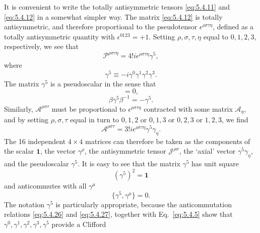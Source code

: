 It is convenient to write the totally antisymmetric tensors \eqref{eq:5.4.11} and
\eqref{eq:5.4.12} in a somewhat simpler way. The matrix \eqref{eq:5.4.12} is totally
antisymmetric, and therefore proportional to the pseudotensor
$\epsilon^{\rho\sigma\tau\eta}$, defined as a totally antisymmetric quantity
with $\epsilon^{0123}=+1$. Setting $\rho,\sigma,\tau,\eta$ equal to $0,1,2,3$,
respectively, we see that
\begin{equation}
\mathcal{P}^{\rho\sigma\tau\eta}=4!i\epsilon^{\rho\sigma\tau\eta}\gamma^5,
\tag{5.4.21}\label{eq:5.4.21}
\end{equation}
where
\begin{equation}
\gamma^5\equiv-i\gamma^0\gamma^1\gamma^2\gamma^3.
\tag{5.4.22}\label{eq:5.4.22}
\end{equation}
The matrix $\gamma^5$ is a pseudoscalar in the sense that
\begin{equation}
[\mathcal{J}^{\rho\sigma},\gamma^5]=0,
\tag{5.4.23}\label{eq:5.4.23}
\end{equation}
\begin{equation}
\beta\gamma^5\beta^{-1}=-\gamma^5.
\tag{5.4.24}\label{eq:5.4.24}
\end{equation}
Similarly, $\mathcal{A}^{\rho\sigma\tau}$ must be proportional to
$\epsilon^{\rho\sigma\tau\eta}$ contracted with some matrix $\mathcal{A}_\eta$,
and by setting $\rho,\sigma,\tau$ equal in turn to $0,1,2$ or $0,1,3$ or
$0,2,3$ or $1,2,3$, we find
\begin{equation}
\mathcal{A}^{\rho\sigma\tau}=3!i\epsilon^{\rho\sigma\tau\eta}\gamma^5\gamma_\eta.
\tag{5.4.25}\label{eq:5.4.25}
\end{equation}
The 16 independent $4\times4$ matrices can therefore be taken as the
components of the scalar $\mathbf{1}$, the vector $\gamma^\rho$, the
antisymmetric tensor $\mathcal{J}^{\rho\sigma}$, the `axial' vector
$\gamma^5\gamma_\eta$, and the pseudoscalar $\gamma^5$. It is easy to see that
the matrix $\gamma^5$ has unit square
\begin{equation}
(\gamma^5)^2=\mathbf{1}
\tag{5.4.26}\label{eq:5.4.26}
\end{equation}
and anticommutes with all $\gamma^\mu$
\begin{equation}
\{\gamma^5,\gamma^\mu\}=0.
\tag{5.4.27}\label{eq:5.4.27}
\end{equation}
The notation $\gamma^5$ is particularly appropriate, because the
anticommutation relations \eqref{eq:5.4.26} and \eqref{eq:5.4.27}, together with Eq.~\eqref{eq:5.4.5}
show that $\gamma^0,\gamma^1,\gamma^2,\gamma^3,\gamma^5$ provide a Clifford
